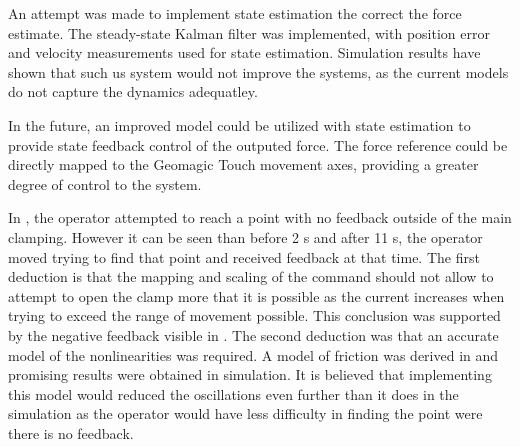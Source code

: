 An attempt was made to implement state estimation the correct the force estimate.
The steady-state Kalman filter was implemented, with position error and velocity measurements used for state estimation.
Simulation results have shown that such us system would not improve the systems, as the current models do not capture the dynamics adequatley.

In the future, an improved model could be utilized with state estimation to provide state feedback control of the outputed force.
The force reference could be directly mapped to the Geomagic Touch movement axes, providing a greater degree of control to the system.

In , the operator attempted to reach a point with no feedback outside of the main clamping. However it can be seen than before 2 s and after 11 s, the operator moved trying to find that point and received feedback at that time. The first deduction is that the mapping and scaling of the command should not allow to attempt to open the clamp more that it is possible as the current increases when trying to exceed the range of movement possible. This conclusion was supported by the negative feedback visible in . The second deduction was that an accurate model of the nonlinearities was required. A model of friction was derived in  and promising results were obtained in simulation. It is believed that implementing this model would reduced the oscillations even further than it does in the simulation as the operator would have less difficulty in finding the point were there is no feedback.

